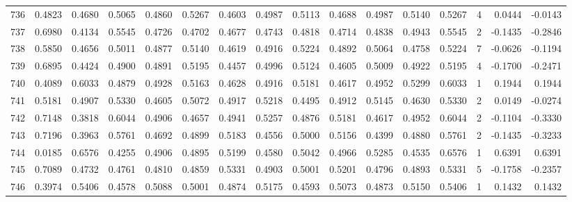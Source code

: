 \begin{tabular}{lrrrrrrrrrrrrrrr}
736 &      0.4823 &  0.4680 &  0.5065 &  0.4860 &  0.5267 &  0.4603 &  0.4987 &  0.5113 &  0.4688 &  0.4987 &   0.5140 &     0.5267 &      4 &                    0.0444 &                    -0.0143 \\
737 &      0.6980 &  0.4134 &  0.5545 &  0.4726 &  0.4702 &  0.4677 &  0.4743 &  0.4818 &  0.4714 &  0.4838 &   0.4943 &     0.5545 &      2 &                   -0.1435 &                    -0.2846 \\
738 &      0.5850 &  0.4656 &  0.5011 &  0.4877 &  0.5140 &  0.4619 &  0.4916 &  0.5224 &  0.4892 &  0.5064 &   0.4758 &     0.5224 &      7 &                   -0.0626 &                    -0.1194 \\
739 &      0.6895 &  0.4424 &  0.4900 &  0.4891 &  0.5195 &  0.4457 &  0.4996 &  0.5124 &  0.4605 &  0.5009 &   0.4922 &     0.5195 &      4 &                   -0.1700 &                    -0.2471 \\
740 &      0.4089 &  0.6033 &  0.4879 &  0.4928 &  0.5163 &  0.4628 &  0.4916 &  0.5181 &  0.4617 &  0.4952 &   0.5299 &     0.6033 &      1 &                    0.1944 &                     0.1944 \\
741 &      0.5181 &  0.4907 &  0.5330 &  0.4605 &  0.5072 &  0.4917 &  0.5218 &  0.4495 &  0.4912 &  0.5145 &   0.4630 &     0.5330 &      2 &                    0.0149 &                    -0.0274 \\
742 &      0.7148 &  0.3818 &  0.6044 &  0.4906 &  0.4657 &  0.4941 &  0.5257 &  0.4876 &  0.5181 &  0.4617 &   0.4952 &     0.6044 &      2 &                   -0.1104 &                    -0.3330 \\
743 &      0.7196 &  0.3963 &  0.5761 &  0.4692 &  0.4899 &  0.5183 &  0.4556 &  0.5000 &  0.5156 &  0.4399 &   0.4880 &     0.5761 &      2 &                   -0.1435 &                    -0.3233 \\
744 &      0.0185 &  0.6576 &  0.4255 &  0.4906 &  0.4895 &  0.5199 &  0.4580 &  0.5042 &  0.4966 &  0.5285 &   0.4535 &     0.6576 &      1 &                    0.6391 &                     0.6391 \\
745 &      0.7089 &  0.4732 &  0.4761 &  0.4810 &  0.4859 &  0.5331 &  0.4903 &  0.5001 &  0.5201 &  0.4796 &   0.4893 &     0.5331 &      5 &                   -0.1758 &                    -0.2357 \\
746 &      0.3974 &  0.5406 &  0.4578 &  0.5088 &  0.5001 &  0.4874 &  0.5175 &  0.4593 &  0.5073 &  0.4873 &   0.5150 &     0.5406 &      1 &                    0.1432 &                     0.1432 \\

\end{tabular}
